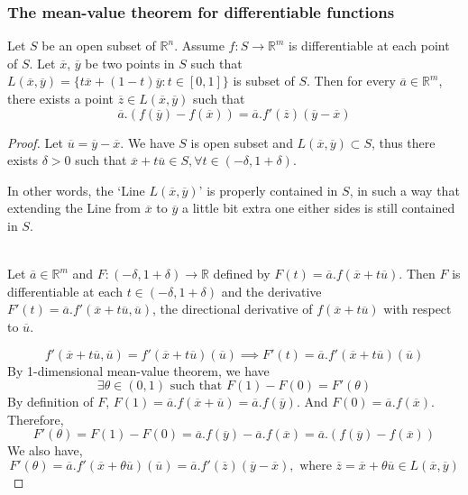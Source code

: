 \subsubsection{The mean-value theorem for differentiable functions}
\begin{theorem}
	Let $S$ be an open subset of $\mathbb{R}^n$. Assume $f : S \to \mathbb{R}^m$ is differentiable at each point of $S$. Let $\overline{x}$, $\overline{y}$ be two points in $S$ such that $L(\overline{x},\overline{y}) = \{ t\overline{x}+(1-t)\overline{y} : t \in [0,1] \}$ is subset of $S$. Then for every $\overline{a} \in \mathbb{R}^m$, there exists a point $\overline{z} \in L(\overline{x},\overline{y})$ such that
	\[ \overline{a}.\left( f(\overline{y})-f(\overline{x}) \right) = \overline{a}.f'(\overline{z})(\overline{y}-\overline{x}) \]
\end{theorem}
\begin{proof}
	Let $\overline{u} = \overline{y}-\overline{x}$. We have $S$ is open subset and $L(\overline{x},\overline{y}) \subset S$, thus there exists $\delta > 0$ such that $\overline{x}+t\overline{u} \in S, \forall t \in (-\delta,1+\delta)$.\begin{commentary} In other words, the `Line $L(\overline{x},\overline{y})$' is properly contained in $S$, in such a way that extending the Line from $\overline{x}$ to $\overline{y}$ a little bit extra one either sides is still contained in $S$.\end{commentary}\\

	Let $\overline{a} \in \mathbb{R}^m$ and $F : (-\delta,1+\delta) \to \mathbb{R}$ defined by $F(t) = \overline{a}.f(\overline{x}+t\overline{u})$.  Then $F$ is differentiable at each $t \in (-\delta,1+\delta)$ and the derivative $F'(t) = \overline{a}.f'(\overline{x}+t\overline{u},\overline{u})$, the directional derivative of $f(\overline{x}+t\overline{u})$ with respect to $\overline{u}$.

	\[ f'(\overline{x}+t\overline{u},\overline{u}) = f'(\overline{x}+t\overline{u})(\overline{u}) \implies F'(t) = \overline{a}.f'(\overline{x}+t\overline{u})(\overline{u}) \]
	By 1-dimensional mean-value theorem, we have
	\[ \exists \theta \in (0,1) \text{ such that } F(1) - F(0) = F'(\theta) \]
	By definition of $F$, $F(1) = \overline{a}.f(\overline{x}+\overline{u}) = \overline{a}.f(\overline{y})$. And $F(0) =\overline{a}.f(\overline{x})$. Therefore,
	\[ F'(\theta) = F(1) - F(0) = \overline{a}.f(\overline{y}) - \overline{a}.f(\overline{x}) = \overline{a}.(f(\overline{y})-f(\overline{x})) \]
	We also have,
	\[ F'(\theta) = \overline{a}.f'(\overline{x}+\theta \overline{u})(\overline{u}) = \overline{a}.f'(\overline{z})(\overline{y}-\overline{x}), \text{ where } \overline{z} = \overline{x}+\theta \overline{u} \in L(\overline{x},\overline{y}) \]
\end{proof}


